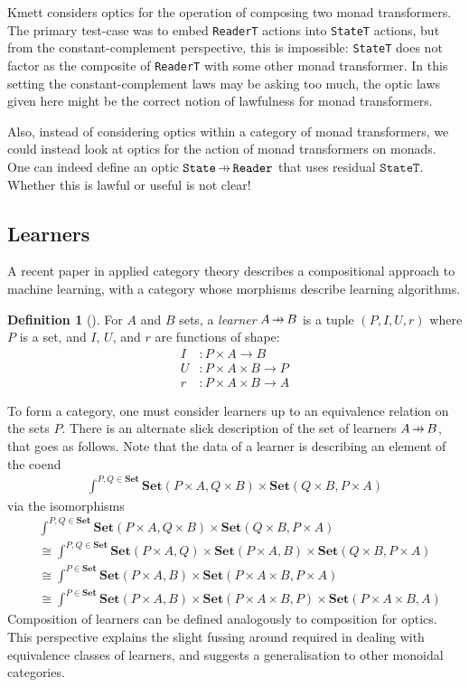 \documentclass[11pt,letterpaper]{article}
\theoremstyle{plain}
\theoremstyle{definition}
\newtheorem{definition}[theorem]{Definition}
\newcommand{\Set}{\mathbf{Set}}
\newcommand{\hto}{\ensuremath{\,\mathaccent\shortmid\rightarrow\,}}
\begin{document}
Kmett considers optics for the operation of composing two monad transformers. The primary test-case was to embed \texttt{ReaderT} actions into \texttt{StateT} actions, but from the constant-complement perspective, this is impossible: \texttt{StateT} does not factor as the composite of \texttt{ReaderT} with some other monad transformer. In this setting the constant-complement laws may be asking too much, the optic laws given here might be the correct notion of lawfulness for monad transformers.

Also, instead of considering optics within a category of monad transformers, we could instead look at optics for the action of monad transformers on monads. One can indeed define an optic $\texttt{State} \hto \texttt{Reader}$ that uses residual $\texttt{StateT}$. Whether this is lawful or useful is not clear!

\subsection{Learners}
A recent paper \cite{BackpropAsFunctor} in applied category theory describes a compositional approach to machine learning, with a category whose morphisms describe learning algorithms.

\begin{definition}[{\cite[Definition 2.1]{BackpropAsFunctor}}]
For $A$ and $B$ sets, a \emph{learner} $A \hto B$ is a tuple $(P, I, U, r)$ where $P$ is a set, and $I$, $U$, and $r$ are functions of shape:
\begin{align*}
I &: P \times A \to B \\
U &: P \times A \times B \to P \\
r &: P \times A \times B \to A
\end{align*}
\end{definition}
To form a category, one must consider learners up to an equivalence relation on the sets $P$. There is an alternate slick description of the set of learners $A \hto B$, that goes as follows. Note that the data of a learner is describing an element of the coend
\begin{align*}
\int^{P, Q \in \Set} \Set(P \times A, Q \times B) \times \Set(Q \times B, P \times A) 
\end{align*}
via the isomorphisms
\begin{align*}
&\int^{P, Q \in \Set} \Set(P \times A, Q \times B) \times \Set(Q \times B, P \times A) \\
&\cong \int^{P, Q \in \Set} \Set(P \times A, Q) \times \Set(P \times A, B) \times \Set(Q \times B, P \times A) \\
&\cong \int^{P \in \Set} \Set(P \times A, B) \times \Set(P \times A \times B, P \times A) \\
&\cong \int^{P \in \Set} \Set(P \times A, B) \times \Set(P \times A \times B, P) \times \Set(P \times A \times B, A)
\end{align*}
Composition of learners can be defined analogously to composition for optics. This perspective explains the slight fussing around required in dealing with equivalence classes of learners, and suggests a generalisation to other monoidal categories.
\end{document}
